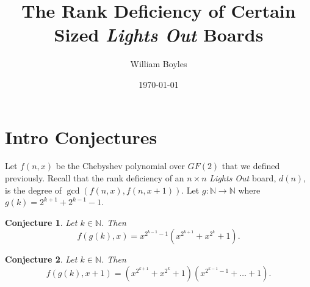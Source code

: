 \documentclass{article}
\newtheorem{conjecture}{Conjecture}
\newcommand{\N}{\mathbb{N}}
\begin{document}
	\title{The Rank Deficiency of Certain Sized \textit{Lights Out} Boards}
	\author{William Boyles}
	\date{\today}
	\maketitle
	
	\section{Intro Conjectures}
	Let $f(n,x)$ be the Chebyshev polynomial over $GF(2)$ that we defined previously.
	Recall that the rank deficiency of an $n \times n$ \textit{Lights Out} board, $d(n)$, is the degree of $\gcd(f(n,x), f(n,x+1))$.
	Let $g: \N \to \N$ where $g(k) = 2^{k+1} + 2^{k-1} - 1$.

	\begin{conjecture}
		\label{conj1}
		Let $k \in \N$.
		Then
		\begin{equation*}
			f(g(k), x) = x^{2^{k-1}-1}\left(x^{2^{k+1}}+x^{2^k}+1\right).
		\end{equation*}
	\end{conjecture}

	\begin{conjecture}
		\label{conj2}
		Let $k \in \N$.
		Then
		\begin{equation*}
			f(g(k), x+1) = \left(x^{2^{k+1}}+x^{2^k}+1\right)\left(x^{2^{k-1}-1}+\dots+1\right).
		\end{equation*}
	\end{conjecture}
	
\end{document}
